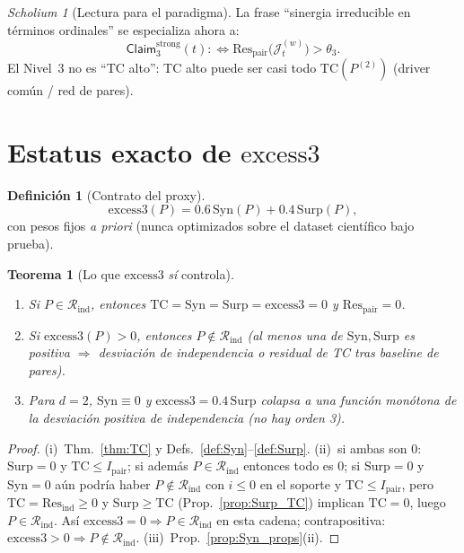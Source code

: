 \documentclass[11pt,a4paper]{article}
\theoremstyle{definition}
\newtheorem{definition}{Definici\'on}[section]
\theoremstyle{plain}
\newtheorem{theorem}{Teorema}[section]
\theoremstyle{remark}
\newtheorem{scholium}{Scholium}[section]
\newcommand{\Res}{\mathrm{Res}}
\newcommand{\TC}{\mathrm{TC}}
\newcommand{\Syn}{\mathrm{Syn}}
\newcommand{\Surp}{\mathrm{Surp}}
\newcommand{\excess}{\mathrm{excess3}}
\newcommand{\Rind}{\mathcal{R}_{\mathrm{ind}}}
\newcommand{\Jwin}{\mathcal{J}}
\newcommand{\claim}{\mathsf{Claim}}
\begin{document}
\begin{scholium}[Lectura para el paradigma]
La frase ``sinergia irreducible en t\'erminos ordinales'' se especializa
ahora a:
\[
\claim_3^{\mathrm{strong}}(t)
:\iff
\Res_{\mathrm{pair}}\bigl(\Jwin_t^{(w)}\bigr)>\theta_3.
\]
El Nivel~3 no es ``TC alto'': TC alto puede ser casi todo
$\TC(P^{(2)})$ (driver com\'un / red de pares).
\end{scholium}

\section{Estatus exacto de $\excess$}
\label{sec:excess_status}

\begin{definition}[Contrato del proxy]
\label{def:excess}
\begin{equation}
\excess(P)=0.6\,\Syn(P)+0.4\,\Surp(P),
\end{equation}
con pesos fijos \emph{a priori} (nunca optimizados sobre el dataset
cient\'ifico bajo prueba).
\end{definition}

\begin{theorem}[Lo que $\excess$ \emph{s\'i} controla]
\label{thm:excess_yes}
\begin{enumerate}[label=(\roman*)]
  \item Si $P\in\Rind$, entonces $\TC=\Syn=\Surp=\excess=0$ y
  $\Res_{\mathrm{pair}}=0$.
  \item Si $\excess(P)>0$, entonces $P\notin\Rind$ (al menos una de
  $\Syn,\Surp$ es positiva $\Rightarrow$ desviaci\'on de independencia o
  residual de TC tras baseline de pares).
  \item Para $d=2$, $\Syn\equiv 0$ y $\excess=0.4\,\Surp$ colapsa a una
  funci\'on mon\'otona de la desviaci\'on positiva de independencia
  (no hay orden 3).
\end{enumerate}
\end{theorem}

\begin{proof}
(i)~Thm.~\ref{thm:TC} y Defs.~\ref{def:Syn}--\ref{def:Surp}.
(ii)~si ambas son 0: $\Surp=0$ y $\TC\le I_{\mathrm{pair}}$; si adem\'as
$P\in\Rind$ entonces todo es 0; si $\Surp=0$ y $\Syn=0$ a\'un podr\'ia
haber $P\notin\Rind$ con $i\le 0$ en el soporte y $\TC\le I_{\mathrm{pair}}$,
pero $\TC=\Res_{\mathrm{ind}}\ge 0$ y $\Surp\ge\TC$ (Prop.~\ref{prop:Surp_TC})
implican $\TC=0$, luego $P\in\Rind$. As\'i $\excess=0\Rightarrow P\in\Rind$
en esta cadena; contrapositiva: $\excess>0\Rightarrow P\notin\Rind$.
(iii)~Prop.~\ref{prop:Syn_props}(ii).
\end{proof}
\end{document}
